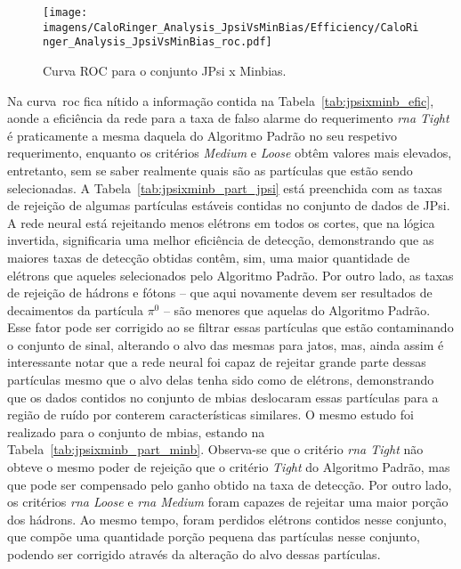 \begin{figure}[ht]
\centering
\texttt{[image: imagens/CaloRinger\_Analysis\_JpsiVsMinBias/Efficiency/CaloRinger\_Analysis\_JpsiVsMinBias\_roc.pdf]}
\caption{Curva ROC para o conjunto JPsi x Minbias.}
\label{fig:jpsixminb_roc}
\end{figure}

Na curva~\gls{roc} fica nítido a informação contida na
Tabela~\ref{tab:jpsixminb_efic}, aonde a eficiência da rede para a taxa de falso
alarme do requerimento \emph{\gls{rna} Tight} é praticamente a mesma daquela do Algoritmo
Padrão no seu respetivo requerimento, enquanto os critérios \emph{Medium} e
\emph{Loose} obtêm valores mais elevados, entretanto, sem se saber realmente
quais são as partículas que estão sendo selecionadas. A
Tabela~\ref{tab:jpsixminb_part_jpsi} está preenchida com as taxas de rejeição de
algumas partículas estáveis contidas no conjunto de dados de JPsi. A rede neural
está rejeitando menos elétrons em todos os cortes, que na lógica invertida, 
significaria uma melhor eficiência de detecção, demonstrando que as maiores taxas
de detecção obtidas contêm, sim, uma maior quantidade de elétrons que aqueles
selecionados pelo Algoritmo Padrão. Por outro lado, as taxas de rejeição de
hádrons e fótons -- que aqui novamente devem ser resultados de decaimentos da
partícula $\pi^0$ -- são menores que aquelas do Algoritmo Padrão. Esse fator
pode ser corrigido ao se filtrar essas partículas que estão contaminando o
conjunto de sinal, alterando o alvo das mesmas para jatos, mas, ainda assim é
interessante notar que a rede neural foi capaz de rejeitar grande parte
dessas partículas mesmo que o alvo delas tenha sido como de elétrons,
demonstrando que os dados contidos no conjunto de \gls{mbias} deslocaram essas
partículas para a região de ruído por conterem características similares. O
mesmo estudo foi realizado para o conjunto de \gls{mbias}, estando na
Tabela~\ref{tab:jpsixminb_part_minb}. Observa-se que o critério \emph{\gls{rna}
Tight} não obteve o mesmo poder de rejeição que o critério \emph{Tight} do
Algoritmo Padrão, mas que pode ser compensado pelo ganho obtido na taxa de
detecção. Por outro lado, os critérios \emph{\gls{rna} Loose} e \emph{\gls{rna} Medium} 
foram capazes de rejeitar uma maior porção dos hádrons. Ao mesmo tempo, foram
perdidos elétrons contidos nesse conjunto, que compõe uma quantidade porção
pequena das partículas nesse conjunto, podendo ser corrigido através da
alteração do alvo dessas partículas.



